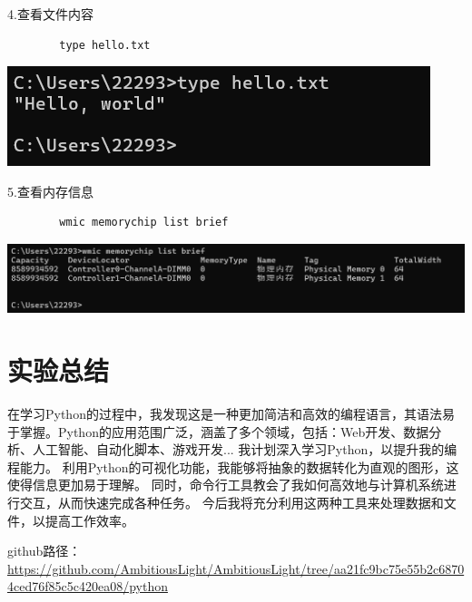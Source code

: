 \documentclass{article}
\begin{document}
	4.查看文件内容
	\begin{verbatim}
		type hello.txt
	\end{verbatim}
	
	\noindent
	\begin{minipage}{\linewidth}
		\centering
		\includegraphics[width=0.5\linewidth]{example14.png}
		\label{fig:example}
	\end{minipage}
	
	5.查看内存信息
	\begin{verbatim}
		wmic memorychip list brief
	\end{verbatim}
	
	\noindent
	\begin{minipage}{\linewidth}
		\centering
		\includegraphics[width=0.5\linewidth]{example15.png}
		\label{fig:example}
	\end{minipage}
	
	\section{实验总结}
	在学习Python的过程中，我发现这是一种更加简洁和高效的编程语言，其语法易于掌握。Python的应用范围广泛，涵盖了多个领域，包括：Web开发、数据分析、人工智能、自动化脚本、游戏开发...
	我计划深入学习Python，以提升我的编程能力。
	利用Python的可视化功能，我能够将抽象的数据转化为直观的图形，这使得信息更加易于理解。
	同时，命令行工具教会了我如何高效地与计算机系统进行交互，从而快速完成各种任务。
	今后我将充分利用这两种工具来处理数据和文件，以提高工作效率。

	github路径：
	\url{https://github.com/AmbitiousLight/AmbitiousLight/tree/aa21fc9bc75e55b2c68704ced76f85c5c420ea08/python}
\end{document}
